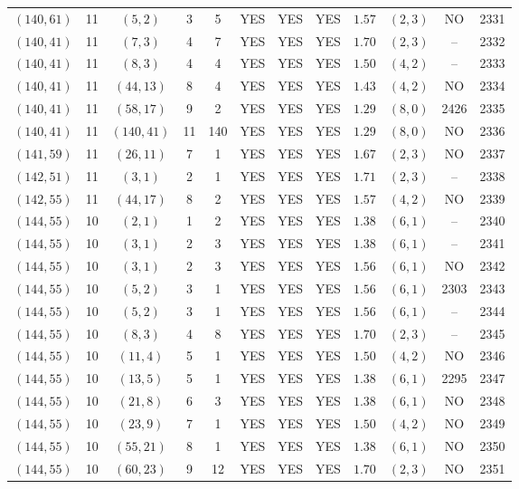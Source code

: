 \begin{longtable}{|c|c|c|c|c|c|c|c|c|c|c|c|}
$(140,61)$ & 11 & $(5,2)$ & 3 & 5 & YES & YES & YES & $1.57$ & $(2,3)$ & NO & 2331\\
$(140,41)$ & 11 & $(7,3)$ & 4 & 7 & YES & YES & YES & $1.70$ & $(2,3)$ & -- & 2332\\
$(140,41)$ & 11 & $(8,3)$ & 4 & 4 & YES & YES & YES & $1.50$ & $(4,2)$ & -- & 2333\\
$(140,41)$ & 11 & $(44,13)$ & 8 & 4 & YES & YES & YES & $1.43$ & $(4,2)$ & NO & 2334\\
$(140,41)$ & 11 & $(58,17)$ & 9 & 2 & YES & YES & YES & $1.29$ & $(8,0)$ & 2426 & 2335\\
$(140,41)$ & 11 & $(140,41)$ & 11 & 140 & YES & YES & YES & $1.29$ & $(8,0)$ & NO & 2336\\
$(141,59)$ & 11 & $(26,11)$ & 7 & 1 & YES & YES & YES & $1.67$ & $(2,3)$ & NO & 2337\\
$(142,51)$ & 11 & $(3,1)$ & 2 & 1 & YES & YES & YES & $1.71$ & $(2,3)$ & -- & 2338\\
$(142,55)$ & 11 & $(44,17)$ & 8 & 2 & YES & YES & YES & $1.57$ & $(4,2)$ & NO & 2339\\
$(144,55)$ & 10 & $(2,1)$ & 1 & 2 & YES & YES & YES & $1.38$ & $(6,1)$ & -- & 2340\\
$(144,55)$ & 10 & $(3,1)$ & 2 & 3 & YES & YES & YES & $1.38$ & $(6,1)$ & -- & 2341\\
$(144,55)$ & 10 & $(3,1)$ & 2 & 3 & YES & YES & YES & $1.56$ & $(6,1)$ & NO & 2342\\
$(144,55)$ & 10 & $(5,2)$ & 3 & 1 & YES & YES & YES & $1.56$ & $(6,1)$ & 2303 & 2343\\
$(144,55)$ & 10 & $(5,2)$ & 3 & 1 & YES & YES & YES & $1.56$ & $(6,1)$ & -- & 2344\\
$(144,55)$ & 10 & $(8,3)$ & 4 & 8 & YES & YES & YES & $1.70$ & $(2,3)$ & -- & 2345\\
$(144,55)$ & 10 & $(11,4)$ & 5 & 1 & YES & YES & YES & $1.50$ & $(4,2)$ & NO & 2346\\
$(144,55)$ & 10 & $(13,5)$ & 5 & 1 & YES & YES & YES & $1.38$ & $(6,1)$ & 2295 & 2347\\
$(144,55)$ & 10 & $(21,8)$ & 6 & 3 & YES & YES & YES & $1.38$ & $(6,1)$ & NO & 2348\\
$(144,55)$ & 10 & $(23,9)$ & 7 & 1 & YES & YES & YES & $1.50$ & $(4,2)$ & NO & 2349\\
$(144,55)$ & 10 & $(55,21)$ & 8 & 1 & YES & YES & YES & $1.38$ & $(6,1)$ & NO & 2350\\
$(144,55)$ & 10 & $(60,23)$ & 9 & 12 & YES & YES & YES & $1.70$ & $(2,3)$ & NO & 2351\\

\end{longtable}
